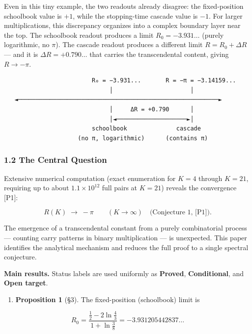 \documentclass[
  11pt,
]{article}
\providecommand{\tightlist}{%
  \setlength{\itemsep}{0pt}\setlength{\parskip}{0pt}}
\begin{document}
Even in this tiny example, the two readouts already disagree: the fixed-position
schoolbook value is \(+1\), while the stopping-time cascade value is \(-1\). For
larger multiplications, this discrepancy organizes into a complex boundary layer
near the top. The schoolbook readout produces a limit \(R_0 = -3.931\ldots\)
(purely logarithmic, no \(\pi\)). The cascade readout produces a different limit
\(R = R_0 + \Delta R\) --- and it is \(\Delta R = +0.790\ldots\) that carries
the transcendental content, giving \(R \to -\pi\).

\begin{verbatim}
                         R₀ = −3.931...       R = −π = −3.14159...
                              │                      │
   ◄─────────────────────────────────────────────────────────►
                              │     ΔR = +0.790      │
                              │◄────────────────────►│
                         schoolbook              cascade
                     (no π, logarithmic)      (contains π)
\end{verbatim}

\subsubsection{1.2 The Central Question}\label{the-central-question}

Extensive numerical computation (exact enumeration for \(K = 4\) through
\(K = 21\), requiring up to about \(1.1 \times 10^{12}\) full pairs at
\(K = 21\)) reveals the convergence {[}P1{]}:

\[R(K) \;\longrightarrow\; -\pi \qquad (K \to \infty) \quad \text{(Conjecture 1, [P1])}.\]

The emergence of a transcendental constant from a purely combinatorial process
--- counting carry patterns in binary multiplication --- is unexpected. This
paper identifies the analytical mechanism and reduces the full proof to a single
spectral conjecture.

\textbf{Main results.} Status labels are used uniformly as \textbf{Proved},
\textbf{Conditional}, and \textbf{Open target}.

\begin{enumerate}
\def\labelenumi{\arabic{enumi}.}
\tightlist
\item
  \textbf{Proposition 1} (§3). The fixed-position (schoolbook) limit is
\end{enumerate}

\[R_0 = \frac{\tfrac{1}{2} - 2\ln\tfrac{4}{3}}{1 + \ln\tfrac{3}{8}} = -3.931205442837\ldots\]
\end{document}
